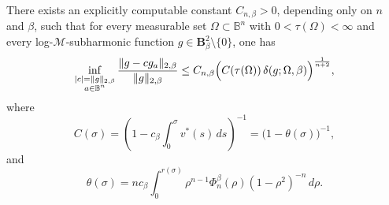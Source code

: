 \documentclass[a4paper,10pt]{amsart}
\begin{document}
\begin{numthm}\label{stabb}
There exists an explicitly computable constant \(C_{n,\beta}>0\), depending only on
\(n\) and \(\beta\), such that for every measurable set
\(\Omega\subset \mathbb{B}^n\) with \(0<\tau(\Omega)<\infty\) and every
log-\(\mathcal M\)-subharmonic function \(g\in \mathbf{B}^2_\beta\setminus\{0\}\),
one has
\[
\inf_{\substack{|c|=\|g\|_{2,\beta}\\ a\in\mathbb{B}^n}}
\frac{\|g-cg_a\|_{2,\beta}}{\|g\|_{2,\beta}}
\le
C_{n,\beta}\Bigl(C(\tau(\Omega))\,\delta(g;\Omega,\beta)\Bigr)^{\frac1{n+2}},
\]
where
\[
C(\sigma)
=
\left(1-c_\beta\int_0^\sigma v^*(s)\,ds\right)^{-1}
=
\bigl(1-\theta(\sigma)\bigr)^{-1},
\]
and
\[
\theta(\sigma)
=
n c_\beta \int_0^{r(\sigma)}
\rho^{n-1}\Phi_n^\beta(\rho)(1-\rho^2)^{-n}\,d\rho .
\]
\end{numthm}

\end{document}

